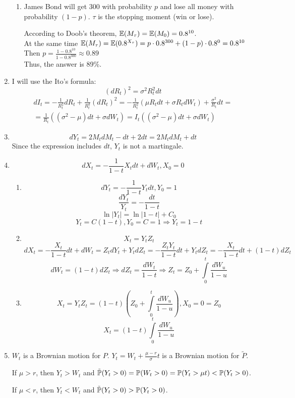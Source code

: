 \documentclass[12pt, a4paper]{article}
\begin{document}
\begin{enumerate}
\begin{enumerate}
\item James Bond will get 300 with probability $p$ and lose all money with probability $(1-p)$. $\tau$ is the stopping moment (win or lose).

According to Doob's theorem, $\E(M_{\tau})=\E(M_0)=0.8^{10}$.\\
At the same time $\E(M_{\tau})=\E(0.8^{X_{\tau}})=p\cdot 0.8^{300}+(1-p)\cdot 0.8^0=0.8^{10}$\\
Then $p=\frac{1-0.8^{10}}{1-0.8^{300}}\approx0.89$\\
Thus, the answer is 89\%.
\end{enumerate}

\item I will use the Ito's formula:
\[
(dR_t)^2=\sigma^2R_t^2dt
\]
\begin{multline}
dI_t=-\frac{1}{R_t^2}dR_t+\frac{1}{R_t^3} (dR_t)^2=-\frac{1}{R_t^2}(\mu R_t dt+\sigma R_tdW_t)+\frac{\sigma^2}{R_t}dt=\\
=\frac{1}{R_t}((\sigma^2-\mu)dt+\sigma dW_t)=I_t((\sigma^2-\mu)dt+\sigma dW_t)
\end{multline}

\item
\[
dY_t=2M_tdM_t-dt+2dt=2M_tdM_t+dt
\]
Since the expression includes $dt$, $Y_t$ is not a martingale.

\item
\[
dX_t=-\frac{1}{1-t}X_tdt+dW_t,X_0=0
\]
\begin{enumerate}
\item
\[
dY_t=-\frac{1}{1-t}Y_tdt, Y_0=1
\]
\[
\frac{dY_t}{Y_t}=-\frac{dt}{1-t}
\]
\[
\ln|Y_t|=\ln|1-t|+C_0
\]
\[
Y_t=C(1-t), Y_0=C=1\Rightarrow Y_t=1-t
\]
\item
\[
X_t=Y_tZ_t
\]
\[
dX_t=-\frac{X_t}{1-t}dt+dW_t=Z_tdY_t+Y_tdZ_t=-\frac{Z_tY_t}{1-t}dt+Y_tdZ_t=-\frac{X_t}{1-t}dt+(1-t)dZ_t
\]
\[
dW_t=(1-t)dZ_t\Rightarrow dZ_t=\frac{dW_t}{1-t}\Rightarrow Z_t=Z_0+\int\limits_0^t \frac{dW_u}{1-u}
\]
\item
\[
X_t=Y_tZ_t=(1-t)\left(Z_0+\int\limits_0^t \frac{dW_u}{1-u}\right), X_0=0=Z_0
\]
\[
X_t=(1-t)\int\limits_0^t \frac{dW_u}{1-u}
\]
\end{enumerate}

\item
$W_t$ is a Brownian motion for $P$. $Y_t=W_t+\frac{\mu-r}{\sigma} t$ is a Brownian motion for $\tilde P$.

If $\mu>r$, then $Y_t>W_t$ and $\tilde \P(Y_t>0)=\P(W_t>0)=\P(Y_t>\mu t)<\P(Y_t>0)$.

If $\mu<r$, then $Y_t<W_t$ and $\tilde \P(Y_t>0)>\P(Y_t>0)$.


\end{enumerate}
\end{document}

